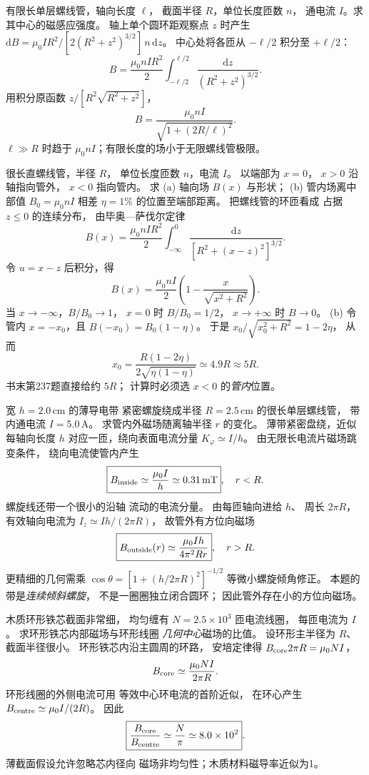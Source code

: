 有限长单层螺线管，轴向长度 $\ell$，
截面半径 $R$，单位长度匝数 $n$，
通电流 $I$。求其中心的磁感应强度。
\exsolution
轴上单个圆环距观察点 $z$ 时产生
$\mathrm dB=\mu_0 IR^2/
[2(R^2+z^2)^{3/2}]\,n\,\mathrm dz$。
中心处将各匝从
$-\ell/2$ 积分至 $+\ell/2$：
\[
B=\frac{\mu_0nIR^2}{2}
\int_{-\ell/2}^{\ell/2}
\frac{\mathrm dz}{(R^2+z^2)^{3/2}}.
\]
用积分原函数
$z/[R^2\sqrt{R^2+z^2}]$，
\[
\boxed{B=
\frac{\mu_0nI}{\sqrt{1+(2R/\ell)^2}}}.
\]
\excheck $\ell\gg R$ 时趋于
$\mu_0nI$；有限长度的场小于无限螺线管极限。

很长直螺线管，半径 $R$，
单位长度匝数 $n$，电流 $I$。
以端部为 $x=0$，
$x>0$ 沿轴指向管外，
$x<0$ 指向管内。
求 (a) 轴向场 $B(x)$ 与形状；
(b) 管内场离中部值
$B_0=\mu_0nI$ 相差 $\eta=1\%$
的位置至端部距离。
\exsolution
把螺线管的环匝看成
占据 $z\le0$ 的连续分布，
由毕奥—萨伐尔定律
\[
B(x)=\frac{\mu_0nIR^2}{2}
\int_{-\infty}^{0}
\frac{\mathrm dz}{[R^2+(x-z)^2]^{3/2}}.
\]
令 $u=x-z$ 后积分，得
\[
\boxed{B(x)=\frac{\mu_0nI}{2}
\left(1-\frac{x}{\sqrt{x^2+R^2}}\right)}.
\]
当 $x\to-\infty$，$B/B_0\to1$，
$x=0$ 时 $B/B_0=1/2$，
$x\to+\infty$ 时 $B\to0$。
(b) 令管内 $x=-x_0$，且
$B(-x_0)=B_0(1-\eta)$。
于是
$x_0/\sqrt{x_0^2+R^2}=1-2\eta$，
从而
\[
\boxed{x_0=
\frac{R(1-2\eta)}
{2\sqrt{\eta(1-\eta)}}
\simeq4.9R\approx5R}.
\]
\excheck 书末第237题直接给约 $5R$；
计算时必须选 $x<0$ 的\emph{管内}位置。

宽 $h=2.0\,\mathrm{cm}$ 的薄导电带
紧密螺旋绕成半径
$R=2.5\,\mathrm{cm}$ 的很长单层螺线管，
带内通电流 $I=5.0\,\mathrm A$。
求管内外磁场随离轴半径 $r$ 的变化。
\exsolution
薄带紧密盘绕，近似每轴向长度 $h$
对应一匝，绕向表面电流分量
$K_\varphi\simeq I/h$。
由无限长电流片磁场跳变条件，
绕向电流使管内产生
\[
\boxed{B_{\rm inside}\simeq
\frac{\mu_0 I}{h}\simeq0.31\,\mathrm{mT}},
\quad r<R.
\]
螺旋线还带一个很小的沿轴
流动的电流分量。
由每匝轴向进给 $h$、
周长 $2\pi R$，
有效轴向电流为
$I_z\simeq I h/(2\pi R)$，
故管外有方位向磁场
\[
\boxed{B_{\rm outside}(r)\simeq
\frac{\mu_0 I h}{4\pi^2Rr}},\quad r>R.
\]
更精细的几何需乘
$\cos\theta=
[1+(h/2\pi R)^2]^{-1/2}$
等微小螺旋倾角修正。
\excheck 本题的带是\emph{连续倾斜螺旋}，
不是一圈圈独立闭合圆环；
因此管外存在小的方位向磁场。

木质环形铁芯截面非常细，
均匀缠有 $N=2.5\times10^3$ 匝电流线圈，
每匝电流为 $I$。
求环形铁芯内部磁场与环形线圈
\emph{几何中心}磁场的比值。
\exsolution
设环形主半径为 $R$、截面半径很小。
环形铁芯内沿主圆周的环路，
安培定律得
$B_{\rm core}2\pi R=\mu_0NI$，
\[
B_{\rm core}\simeq\frac{\mu_0NI}{2\pi R}.
\]
环形线圈的外侧电流可用
等效中心环电流的首阶近似，
在环心产生
$B_{\rm centre}\simeq\mu_0I/(2R)$。
因此
\[
\boxed{\frac{B_{\rm core}}{B_{\rm centre}}
\simeq\frac N\pi
\simeq8.0\times10^2}.
\]
\excheck 薄截面假设允许忽略芯内径向
磁场非均匀性；木质材料磁导率近似为1。

